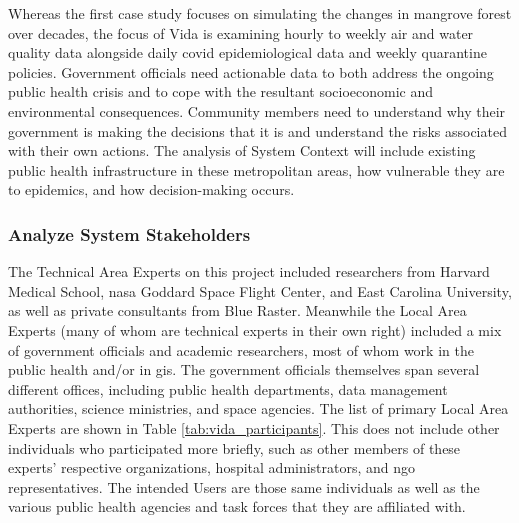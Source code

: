 Whereas the first case study focuses on simulating the changes in mangrove forest over decades, the focus of Vida is examining hourly to weekly air and water quality data alongside daily \ac{covid} epidemiological data and weekly quarantine policies. Government officials need actionable data to both address the ongoing public health crisis and to cope with the resultant socioeconomic and environmental consequences. Community members need to understand why their government is making the decisions that it is and understand the risks associated with their own actions. The analysis of System Context will include existing public health infrastructure in these metropolitan areas, how vulnerable they are to epidemics, and how decision-making occurs.  


\subsubsection{Analyze System Stakeholders}

The Technical Area Experts on this project included researchers from Harvard Medical School, \ac{nasa} Goddard Space Flight Center, and East Carolina University, as well as private consultants from Blue Raster. Meanwhile the Local Area Experts (many of whom are technical experts in their own right) included a mix of government officials and academic researchers, most of whom work in the public health and/or in \ac{gis}. The government officials themselves span several different offices, including public health departments, data management authorities, science ministries, and space agencies. The list of primary Local Area Experts are shown in Table \ref{tab:vida_participants}. This does not include other individuals who participated more briefly, such as other members of these experts' respective organizations, hospital administrators, and \ac{ngo} representatives. The intended Users are those same individuals as well as the various public health agencies and task forces that they are affiliated with.  

